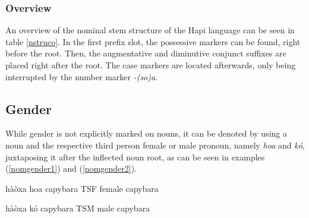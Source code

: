 \documentclass[a4paper, 12pt, oneside]{memoir}
\newcommand{\emh}[1]{\textit{#1}}
\begin{document}
\subsubsection{Overview}
An overview of the nominal stem structure of the Hapi language can be seen in table \ref{nstruco}.
In the first prefix slot, the possessive markers can be found, right before the root. Then, the augmentative and diminutive conjunct suffixes are placed right after the root. The case markers are located afterwards, only being interrupted by the number marker \emh{-(so)a}.
\begin{table}[p!]
    \centering
    \caption{Nominal Stem Structure}
    \label{nstruco}
\end{table}

\subsection{Gender}\label{sgender}
While gender is not explicitly marked on nouns, it can be denoted by using a noun and the respective third person female or male pronoun, namely \emh{hoa} and \emh{kó}, juxtaposing it after the inflected noun root, as can be seen in examples (\ref{nomgender1}) and (\ref{nomgender2}).
\begin{example}
\label{nomgender1}
\bits hàòxa hoa
\gloss capybara TSF
\tr female capybara
\end{example}
\begin{example}
\label{nomgender2}
\bits hàòxa kó 
\gloss capybara TSM 
\tr male capybara
\end{example}
\end{document}
